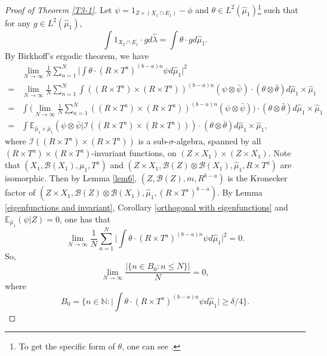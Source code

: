 \documentclass[reqno,12pt]{amsart}
\def \N {\mathbb N}
\def \E {\mathbb E}
\def\B {\mathcal B}
\numberwithin{equation}{section}
\begin{document}
\begin{proof}[Proof of Theorem \ref{T3-1}]
		Let $\psi=1_{Z\times (X_1\cap E_1)}-\phi$ and $\theta\in L^{2}(\hat{\mu}_1)$\footnote{To get the specific form of $\theta$, one can see \cite[Page 129]{G-book}.} such that for any $g\in L^{2}(\hat{\mu}_1)$, $$\int 1_{X_2\cap E_1}\cdot g d\hat{\lambda}=\int \theta \cdot gd\hat{\mu}_1.$$
		By Birkhoff's ergodic theorem, we have
		\begin{align*}
			&\lim_{N\to\infty}\frac{1}{N}\sum_{n=1}^{N}\Big|\int \theta\cdot(R\times T^a)^{(b-a)n}\psi d\hat{\mu}_1\Big|^{2}
			\\ = &
			\lim_{N\to\infty}\frac{1}{N}\sum_{n=1}^{N}\int ((R\times T^a)\times (R\times T^a))^{(b-a)n}(\psi \otimes \bar{\psi})\cdot (\theta \otimes \bar{\theta})d\hat{\mu}_1\times \hat{\mu}_1
			\\ = &
			\int \Big(\lim_{N\to\infty}\frac{1}{N}\sum_{n=1}^{N} ((R\times T^a)\times (R\times T^a))^{(b-a)n}(\psi \otimes \bar{\psi})\Big)\cdot (\theta \otimes \bar{\theta})d\hat{\mu}_1\times \hat{\mu}_1
			\\ = &
			\int \E_{\hat{\mu}_1\times \hat{\mu}_1}(\psi \otimes \bar{\psi}|\mathcal{I}((R\times T^a)\times (R\times T^a)))\cdot (\theta \otimes \bar{\theta})d\hat{\mu}_1\times \hat{\mu}_1,
		\end{align*} where $\mathcal{I}((R\times T^a)\times (R\times T^a))$ is a sub-$\sigma$-algebra, spanned by all $(R\times T^a)\times (R\times T^a)$-invariant functions, on $(Z\times X_1)\times (Z\times X_1)$.
		Note that $(X_1,\B(X_1),\mu_1,T^a)$ and $(Z\times X_1,\B(Z)\otimes \B(X_1),\hat{\mu}_1,R\times T^a)$ are isomorphic. Then by Lemma \ref{lem6}, $(Z,\B(Z),m,R^{b-a})$ is the Kronecker factor of $(Z\times X_1,\B(Z)\otimes \B(X_1),\hat{\mu}_1,(R\times T^a)^{b-a})$. By Lemma \ref{eigenfunctions and invariant}, Corollary \ref{orthogonal with eigenfunctions} and $ \E_{\hat{\mu}_1}(\psi|Z)=0$, one has that  $$\lim_{N\to\infty}\frac{1}{N}\sum_{n=1}^{N}\Big|\int \theta\cdot(R\times T^a)^{(b-a)n}\psi d\hat{\mu}_1\Big|^{2}=0.$$
		So, $$\lim_{N\to\infty}\frac{|\{n\in B_0:n\le N\}|}{N}=0,$$ where
		$$B_0=\Big\{n\in\N:\Big|\int \theta\cdot(R\times T^a)^{(b-a)n}\psi d\hat{\mu}_1\Big|\ge \delta/4\Big\}.$$


\end{proof}
\end{document}
